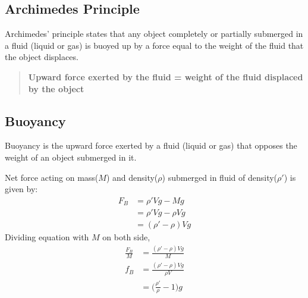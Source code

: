 \documentclass[fleqn,10pt]{SelfArx} %
\begin{document}
\subsection{Archimedes Principle}
Archimedes' principle states that any object completely or partially submerged in a fluid (liquid or gas) is buoyed up by a force equal to the weight of the fluid that the object displaces.

\begin{quote}
\raggedright
\textbf{Upward force exerted by the fluid = weight of the fluid displaced by the object}
\end{quote}

\subsection{Buoyancy}
Buoyancy is the upward force exerted by a fluid (liquid or gas) that opposes the weight of an object submerged in it.

\begin{center}
\end{center}

Net force acting on mass($M$) and density($\rho$) submerged in fluid of density($\rho'$) is given by:
\begin{align}
    F_B &= \rho' Vg - Mg  \label{eq:buoyancy_force} \\
        &= \rho' Vg - \rho Vg \\
        &= (\rho' - \rho) Vg
\end{align}
Dividing equation with $M$ on both side,
\begin{align}
    \frac{F_B}{M} &= \frac{(\rho' - \rho) Vg}{M} \\
    f_B              &= \frac{(\rho' - \rho) Vg}{\rho V} \\
                     &= \Big(\frac{\rho'}{\rho}-1\Big)g  \label{eq:acceration-due-to-buoyancy}
\end{align}
\end{document}
